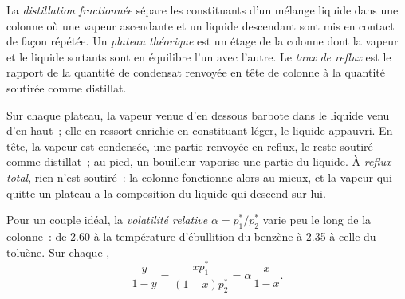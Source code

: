 \begin{definition}\label{def:b2:liquid-vapour-diagrams:fractional-distillation}
La \emph{distillation fractionnée} sépare les
constituants d'un mélange liquide dans une colonne où une vapeur ascendante et un
liquide descendant sont mis en contact de façon répétée. Un \emph{plateau
théorique} est un étage de la colonne dont la vapeur et le
liquide sortants sont en équilibre l'un avec l'autre. Le \emph{taux de
reflux} est le rapport de la quantité de condensat renvoyée
en tête de colonne à la quantité soutirée comme distillat.
\end{definition}

Sur chaque plateau, la vapeur venue d'en dessous barbote dans le liquide venu d'en haut~; elle
en ressort enrichie en constituant léger, le liquide appauvri. En tête, la vapeur
est condensée, une partie renvoyée en reflux, le reste soutiré comme
distillat~; au pied, un bouilleur vaporise une partie du liquide. À
\textit{reflux total}, rien n'est soutiré~: la colonne fonctionne alors au mieux,
et la vapeur qui quitte un plateau a la composition du liquide qui descend
sur lui.


Pour un couple idéal, la \textit{volatilité relative} $\alpha = p_1^*/p_2^*$
varie peu le long de la colonne~: de 2.60 à la température d'ébullition du benzène à
2.35 à celle du toluène. Sur chaque ,
\[
  \frac{y}{1 - y} = \frac{xp_1^*}{(1 - x)p_2^*} = \alpha\,\frac{x}{1 - x} .
\]

